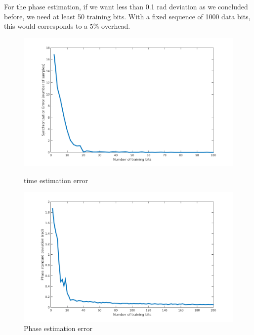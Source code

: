 \documentclass[a4paper,12pt]{article}
\begin{document}
For the phase estimation, if we want less than 0.1 rad deviation as we concluded before, we need at least 50 training bits. With a fixed sequence of 1000 data bits, this would corresponds to a 5\% overhead.

\begin{figure}[ht]
\begin{minipage}[c]{.45\linewidth}
\begin{center}
\includegraphics[scale=0.35]{Training_sync.png}
\caption{time estimation error}
\label{TSE}
\end{center}
\end{minipage}
\hfill
\begin{minipage}[c]{.45\linewidth}
\begin{center}
\includegraphics[scale=0.35]{Training_phase.png}
\caption{Phase estimation error}
\label{TPE}
\end{center}
\end{minipage}
\end{figure}
\end{document}
